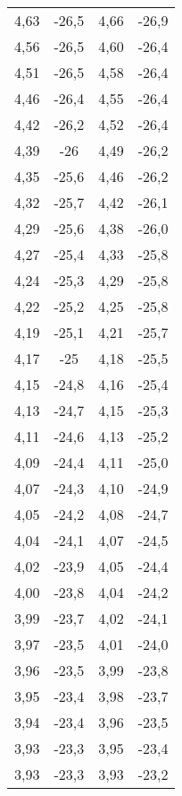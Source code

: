 \begin{longtable}{c c || c c}
4,63 &   -26,5 &  4,66 &   -26,9 \\
4,56 &   -26,5 &  4,60  &   -26,4 \\
4,51 &   -26,5 &  4,58 &   -26,4 \\
4,46 &   -26,4 &  4,55 &   -26,4 \\
4,42 &   -26,2 &  4,52 &   -26,4 \\
4,39 &   -26   &  4,49 &   -26,2 \\
4,35 &   -25,6 &  4,46 &   -26,2 \\
4,32 &   -25,7 &  4,42 &   -26,1 \\
4,29 &   -25,6 &  4,38 &   -26,0   \\
4,27 &   -25,4 &  4,33 &   -25,8 \\
4,24 &   -25,3 &  4,29 &   -25,8 \\
4,22 &   -25,2 &  4,25 &   -25,8 \\
4,19 &   -25,1 &  4,21 &   -25,7 \\
4,17 &   -25   &  4,18 &   -25,5 \\
4,15 &   -24,8 &  4,16 &   -25,4 \\
4,13 &   -24,7 &  4,15 &   -25,3 \\
4,11 &   -24,6 &  4,13 &   -25,2 \\
4,09 &   -24,4 &  4,11 &   -25,0   \\
4,07 &   -24,3 &  4,10  &   -24,9 \\
4,05 &   -24,2 &  4,08 &   -24,7 \\
4,04 &   -24,1 &  4,07 &   -24,5 \\
4,02 &   -23,9 &  4,05 &   -24,4 \\
4,00   &   -23,8 &  4,04 &   -24,2 \\
3,99 &   -23,7 &  4,02 &   -24,1 \\
3,97 &   -23,5 &  4,01 &   -24,0   \\
3,96 &   -23,5 &  3,99 &   -23,8 \\
3,95 &   -23,4 &  3,98 &   -23,7 \\
3,94 &   -23,4 &  3,96 &   -23,5 \\
3,93 &   -23,3 &  3,95 &   -23,4 \\
3,93 &   -23,3 &  3,93 &   -23,2 \\
\end{longtable}
